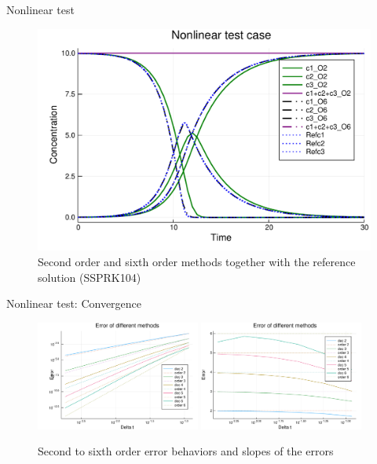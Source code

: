 \documentclass[9pt,compress,t,aspectratio=169]{beamer}
\newcommand{\1}{\begin{pmatrix}
                 1\\
                 1
                \end{pmatrix}}
\begin{document}
\begin{frame}{Nonlinear test}
\begin{figure}[!htp]
\centering
    \includegraphics[height=0.7\textheight]{images/NonlinearWithReferenceSSPRK104.pdf}
  \caption{ Second order and sixth order methods together with the reference solution (SSPRK104)
 }
  \label{fig:Non_linear}
\end{figure}
\end{frame}

\begin{frame}{Nonlinear test: Convergence}
\begin{figure}[!htp]
\centering
    \includegraphics[width=0.48\textwidth]{images/NonlinearIntegralErrorOrders26.pdf}
    \includegraphics[width=0.48\textwidth]{images/NonlinearIntegralSlopesOrders26.pdf}
  \caption{ Second to sixth order error behaviors and slopes of the errors
 }
  \label{fig:Non_Linear_model_error}
\end{figure}


\end{frame}
\end{document}
